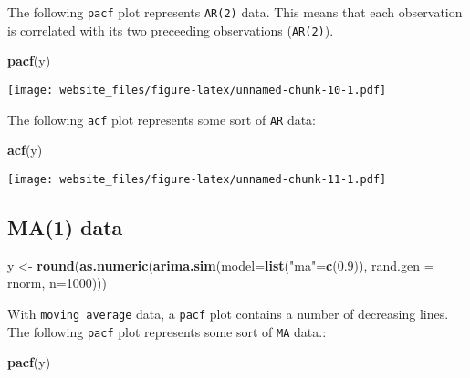 \documentclass[]{book}
\newenvironment{Shaded}{\begin{snugshade}}{\end{snugshade}}
\newcommand{\KeywordTok}[1]{\textcolor[rgb]{0.13,0.29,0.53}{\textbf{#1}}}
\newcommand{\DataTypeTok}[1]{\textcolor[rgb]{0.13,0.29,0.53}{#1}}
\newcommand{\DecValTok}[1]{\textcolor[rgb]{0.00,0.00,0.81}{#1}}
\newcommand{\FloatTok}[1]{\textcolor[rgb]{0.00,0.00,0.81}{#1}}
\newcommand{\StringTok}[1]{\textcolor[rgb]{0.31,0.60,0.02}{#1}}
\newcommand{\NormalTok}[1]{#1}
\begin{document}
The following \texttt{pacf} plot represents \texttt{AR(2)} data. This
means that each observation is correlated with its two preceeding
observations (\texttt{AR(2)}).

\begin{Shaded}
\begin{Highlighting}[]
\KeywordTok{pacf}\NormalTok{(y)}
\end{Highlighting}
\end{Shaded}

\texttt{[image: website\_files/figure-latex/unnamed-chunk-10-1.pdf]}

\newpage

The following \texttt{acf} plot represents some sort of \texttt{AR}
data:

\begin{Shaded}
\begin{Highlighting}[]
\KeywordTok{acf}\NormalTok{(y)}
\end{Highlighting}
\end{Shaded}

\texttt{[image: website\_files/figure-latex/unnamed-chunk-11-1.pdf]}

\newpage 

\subsection{MA(1) data}\label{ma1-data}

\begin{Shaded}
\begin{Highlighting}[]
\NormalTok{y <-}\StringTok{ }\KeywordTok{round}\NormalTok{(}\KeywordTok{as.numeric}\NormalTok{(}\KeywordTok{arima.sim}\NormalTok{(}\DataTypeTok{model=}\KeywordTok{list}\NormalTok{(}\StringTok{"ma"}\NormalTok{=}\KeywordTok{c}\NormalTok{(}\FloatTok{0.9}\NormalTok{)), }\DataTypeTok{rand.gen =}\NormalTok{ rnorm, }\DataTypeTok{n=}\DecValTok{1000}\NormalTok{)))}
\end{Highlighting}
\end{Shaded}

With \texttt{moving\ average} data, a \texttt{pacf} plot contains a
number of decreasing lines. The following \texttt{pacf} plot represents
some sort of \texttt{MA} data.:

\begin{Shaded}
\begin{Highlighting}[]
\KeywordTok{pacf}\NormalTok{(y)}
\end{Highlighting}
\end{Shaded}
\end{document}

